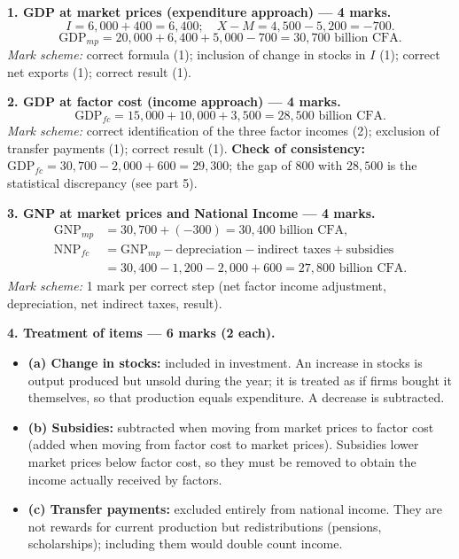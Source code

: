 \documentclass[11pt]{article}
\begin{document}
\begin{corrige}
\textbf{1. GDP at market prices (expenditure approach) — 4 marks.}
\[
I = 6{,}000 + 400 = 6{,}400;\quad X - M = 4{,}500 - 5{,}200 = -700.
\]
\[
\mathrm{GDP}_{mp} = 20{,}000 + 6{,}400 + 5{,}000 - 700 = \boxed{30{,}700 \text{ billion CFA}}.
\]
\emph{Mark scheme:} correct formula (1); inclusion of change in stocks in $I$ (1); correct net exports (1); correct result (1).

\textbf{2. GDP at factor cost (income approach) — 4 marks.}
\[
\mathrm{GDP}_{fc} = 15{,}000 + 10{,}000 + 3{,}500 = \boxed{28{,}500 \text{ billion CFA}}.
\]
\emph{Mark scheme:} correct identification of the three factor incomes (2); exclusion of transfer payments (1); correct result (1). \textbf{Check of consistency:} $\mathrm{GDP}_{fc} = 30{,}700 - 2{,}000 + 600 = 29{,}300$; the gap of $800$ with $28{,}500$ is the statistical discrepancy (see part 5).

\textbf{3. GNP at market prices and National Income — 4 marks.}
\begin{align*}
\mathrm{GNP}_{mp} &= 30{,}700 + (-300) = \boxed{30{,}400 \text{ billion CFA}},\\
\mathrm{NNP}_{fc} &= \mathrm{GNP}_{mp} - \text{depreciation} - \text{indirect taxes} + \text{subsidies}\\
&= 30{,}400 - 1{,}200 - 2{,}000 + 600 = \boxed{27{,}800 \text{ billion CFA}}.
\end{align*}
\emph{Mark scheme:} 1 mark per correct step (net factor income adjustment, depreciation, net indirect taxes, result).

\textbf{4. Treatment of items — 6 marks (2 each).}
\begin{itemize}
\item \textbf{(a) Change in stocks:} included in investment. An increase in stocks is output produced but unsold during the year; it is treated as if firms bought it themselves, so that production equals expenditure. A decrease is subtracted.
\item \textbf{(b) Subsidies:} subtracted when moving from market prices to factor cost (added when moving from factor cost to market prices). Subsidies lower market prices below factor cost, so they must be removed to obtain the income actually received by factors.
\item \textbf{(c) Transfer payments:} excluded entirely from national income. They are not rewards for current production but redistributions (pensions, scholarships); including them would double count income.
\end{itemize}


\end{corrige}
\end{document}
